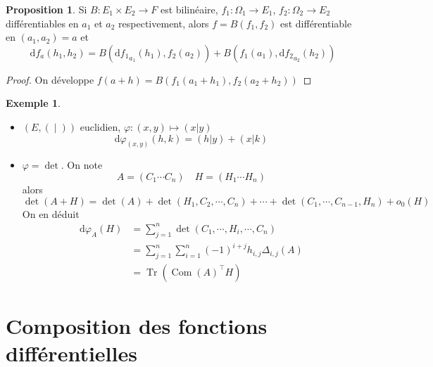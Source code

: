 \documentclass{article}
\theoremstyle{definition}
\newtheorem*{ex}{Exemple}
\newtheorem*{prop}{Proposition}
\DeclareMathOperator{\Tr}{Tr}
\DeclareMathOperator{\Com}{Com}
\begin{document}
\begin{prop}
Si $ B: E_1\times E_2\to F$ est bilinéaire, $f_1:\Omega_1\to E_1$, $f_2:\Omega_2\to E_2$ différentiables en $a_1$ et $a_2$ respectivement, alors $f= B(f_1, f_2)$ est différentiable en $(a_1, a_2)=a$ et \[
    \mathrm df_a(h_1, h_2)= B(\mathrm d{f_1}_{a_1}(h_1), f_2(a_2)) +  B(f_1(a_1), \mathrm d{f_2}_{a_2}(h_2))
\]
\end{prop}

\begin{proof}
On développe $f(a+h)=B(f_1(a_1+h_1), f_2(a_2+h_2))$
\end{proof}

\begin{ex} ~
\begin{itemize}
    \item $(E, (\; |\; ))$ euclidien, $\varphi:(x, y)\longmapsto (x|y)$ \[
        \mathrm d\varphi_{(x, y)}(h, k)=(h|y)+(x|k)
    \]
    \item $\varphi = \det $. On note \[
        A = (C_1 \cdots C_n) \quad H=(H_1 \cdots H_n)
    \]
    alors \[
        \det(A+H)=\det(A)+\det(H_1, C_2, \cdots, C_n)+\cdots + \det(C_1, \cdots, C_{n-1}, H_n)+o_0(H)
    \]
    On en déduit \begin{align*}
        \mathrm d\varphi_A(H) &= \sum_{j=1}^n \det(C_1, \cdots, H_i, \cdots, C_n)\\
        &= \sum_{j=1}^n\sum_{i=1}^n(-1)^{i+j}h_{i, j}\Delta_{i, j}(A) \\
        &= \Tr(\Com(A)^\intercal H)
    \end{align*}
\end{itemize}
\end{ex}

\section{Composition des fonctions différentielles}
\end{document}
